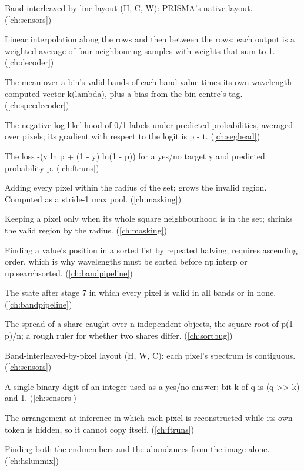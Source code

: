 \begin{description}[style=nextline,leftmargin=1.2em,font=\normalfont\bfseries]
\item[BIL] Band-interleaved-by-line layout (H, C, W): PRISMA's native layout. (\cref{ch:sensors})
\item[Bilinear interpolation] Linear interpolation along the rows and then between the rows; each output is a weighted average of four neighbouring samples with weights that sum to 1. (\cref{ch:decoder})
\item[Bin token] The mean over a bin's valid bands of each band value times its own wavelength-computed vector k(lambda), plus a bias from the bin centre's tag. (\cref{ch:specdecoder})
\item[Binary cross-entropy] The negative log-likelihood of 0/1 labels under predicted probabilities, averaged over pixels; its gradient with respect to the logit is p - t. (\cref{ch:seghead})
\item[Binary cross-entropy (BCE)] The loss -(y ln p + (1 - y) ln(1 - p)) for a yes/no target y and predicted probability p. (\cref{ch:ftruns})
\item[Binary dilation] Adding every pixel within the radius of the set; grows the invalid region. Computed as a stride-1 max pool. (\cref{ch:masking})
\item[Binary erosion] Keeping a pixel only when its whole square neighbourhood is in the set; shrinks the valid region by the radius. (\cref{ch:masking})
\item[Binary search] Finding a value's position in a sorted list by repeated halving; requires ascending order, which is why wavelengths must be sorted before np.interp or np.searchsorted. (\cref{ch:bandpipeline})
\item[Binary validity] The state after stage 7 in which every pixel is valid in all bands or in none. (\cref{ch:bandpipeline})
\item[Binomial standard error] The spread of a share caught over n independent objects, the square root of p(1 - p)/n; a rough ruler for whether two shares differ. (\cref{ch:sortbug})
\item[BIP] Band-interleaved-by-pixel layout (H, W, C): each pixel's spectrum is contiguous. (\cref{ch:sensors})
\item[Bit flag] A single binary digit of an integer used as a yes/no answer; bit k of q is (q >> k) and 1. (\cref{ch:sensors})
\item[Blind spot] The arrangement at inference in which each pixel is reconstructed while its own token is hidden, so it cannot copy itself. (\cref{ch:ftruns})
\item[Blind unmixing] Finding both the endmembers and the abundances from the image alone. (\cref{ch:hslunmix})

\end{description}
